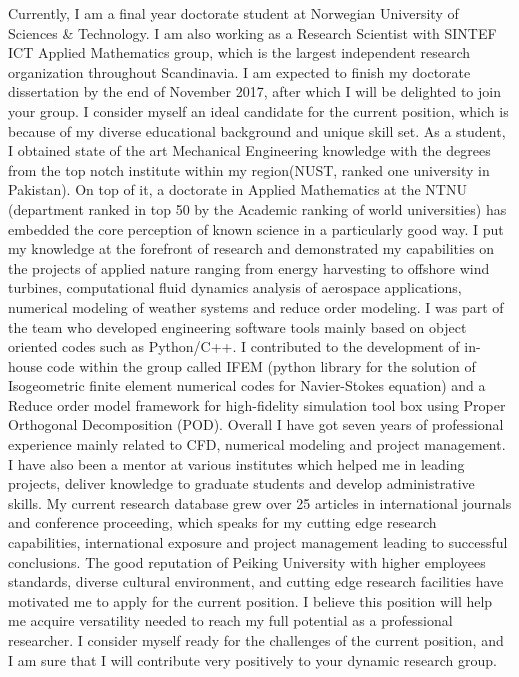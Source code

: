 \documentclass[11pt, a4paper]{awesome-cv}
\begin{document}
\begin{cvletter}
		Currently, I am a final year doctorate student at Norwegian University of Sciences \& Technology. I am also working as a Research Scientist with SINTEF ICT Applied Mathematics group, which is the largest independent research organization throughout Scandinavia.  I am expected to finish my doctorate dissertation by the end of November 2017, after which I will be delighted to join your group.
	I consider myself an ideal candidate for the current position, which is because of my diverse educational background and unique skill set. As a student, I obtained state of the art Mechanical Engineering knowledge with the degrees from the top notch institute within my region(NUST, ranked one university in Pakistan). On top of it, a doctorate in Applied Mathematics at the NTNU (department ranked in top 50 by the Academic ranking of world universities) has embedded the core perception of known science in a particularly good way. I put my knowledge at the forefront of research and demonstrated my capabilities on the projects of applied nature ranging from energy harvesting to offshore wind turbines, computational fluid dynamics analysis of aerospace applications, numerical modeling of weather systems and reduce order modeling. I was part of the team who developed engineering software tools mainly based on object oriented codes such as Python/C++.  I contributed to the development of in-house code within the group called IFEM (python library for the solution of Isogeometric finite element numerical codes for Navier-Stokes equation) and a Reduce order model framework for high-fidelity simulation tool box using Proper Orthogonal Decomposition (POD).
Overall I have got seven years of professional experience mainly related to CFD, numerical modeling and project management. I have also been a mentor at various institutes which helped me in leading projects, deliver knowledge to graduate students and develop administrative skills. My current research database grew over 25  articles in international journals and conference proceeding, which speaks for my cutting edge research capabilities, international exposure and project management leading to successful conclusions.
		The good reputation of Peiking University with higher employees standards, diverse cultural environment, and cutting edge research facilities have motivated me to apply for the current position. I believe this position will help me acquire versatility needed to reach my full potential as a professional researcher. I consider myself ready for the challenges of the current position, and I am sure that I will contribute very positively to your dynamic research group.
	\end{cvletter}
	
	
	\makeletterclosing
	
\end{document}
